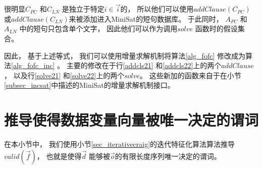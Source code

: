很明显$C_{PC}$ 和$C_{LN}$ 是独立于特定$i\in \vec{i}$的，
所以他们可以使用$addClause(C_{PC})$ 或$addClause(C_{LN})$来被添加进入MiniSat的短句数据库。
于此同时，
$A_{PC}$ 和$A_{LN}$ 中的短句只包含单个文字，
因此他们可以作为调用$solve$ 函数时的假设集合。

因此，
基于上述等式，
我们可以使用增量求解机制将算法\ref{alg_fofc} 修改成为算法\ref{alg_fofc_inc} 。
主要的修改在于行\ref{addcls21} 和\ref{addcls22}上的两个$addClause$ ，
以及行\ref{solve21} 和\ref{solve22}上的两个$solve$。
这些新加的函数来自于在小节\ref{subsec_incsat}中描述的MiniSat的增量求解机制接口。




\section{推导使得数据变量向量被唯一决定的谓词}\label{sec_infer}

在本小节中，
我们使用小节\ref{sec_iterativecraig}的迭代特征化算法算法推导$valid(\vec{f})$，
也就是使得$\vec{d}$ 能够被$\vec{o}$的有限长度序列唯一决定的谓词。

